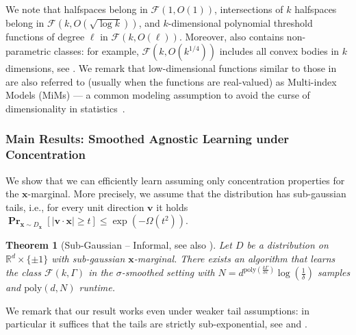 \documentclass[10pt,a4paper]{article}
\newtheorem{theorem}{Theorem}[section]
\renewcommand\vec[1]{\mathbf{#1}}
\DeclareMathOperator*{\pr}{\mathbf{Pr}}
\newcommand{\R}{\mathbb{R}}
\newcommand{\poly}{\mathrm{poly}}
\newcommand{\D}{D}
\newcommand{\1}{\Ind}
\newcommand{\x}{\vec x}
\begin{document}
We note that halfspaces belong in $\mathcal F(1, O(1))$, intersections of $k$ halfspaces belong in $ \mathcal F(k, O(\sqrt{\log k}))$, %
and $k$-dimensional polynomial threshold functions of degree $\ell$ in $\mathcal F(k, O(\ell))$.
Moreover,  also contains non-parametric classes: 
for example, $\mathcal F(k, O(k^{1/4}))$ includes all convex bodies in $k$ dimensions,
see .
We remark that low-dimensional functions similar to those in  are also referred to (usually when the functions are real-valued) as Multi-index Models (MiMs) ---  a common modeling assumption to avoid the curse of dimensionality in statistics~\cite{Friedman:1980tu, Huber85-pp, Li91, HL93,xia2002adaptive, Xia08}.



\subsubsection{Main Results: Smoothed Agnostic Learning under Concentration}

We show that we can efficiently learn assuming only concentration properties for the $\x$-marginal.  More precisely, we assume that the distribution has 
sub-gaussian tails, i.e., for every unit direction $\vec v$ it holds $\pr_{\x \sim \D_\x}[|\vec v \cdot \x| \geq t] \leq \exp(-\Omega(t^2))$. 
\begin{theorem}[Sub-Gaussian -- Informal, see also ]
\label{thm:intro-subgaussian}
    Let $D$ be a distribution on $\R^{d}\times \{\pm 1\}$ with sub-gaussian $\x$-marginal.
    There exists an algorithm that learns the class $\mathcal F(k, \Gamma)$ in 
    the $\sigma$-smoothed setting with 
    $N = d^{\poly(\frac{k\Gamma}{\sigma\epsilon})}\log(\frac{1}{\delta}) $ samples and $\poly(d,N)$ runtime.
\end{theorem}
We remark that our result works even under weaker tail assumptions: in particular it suffices that the tails are strictly sub-exponential, see  and .  
\end{document}
